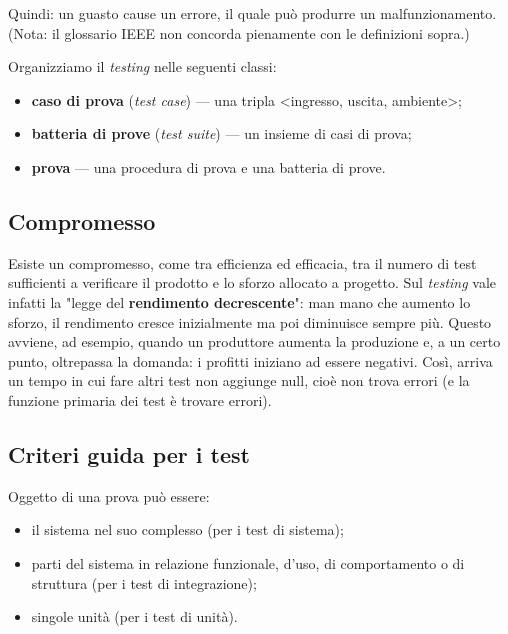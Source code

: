\documentclass[a4paper]{article}
\begin{document}
		
Quindi: un guasto cause un errore, il quale può produrre un malfunzionamento. (Nota: il glossario IEEE non concorda pienamente con le definizioni sopra.)
		
Organizziamo il \emph{testing} nelle seguenti classi:
		
	\begin{itemize}
		
			
	\item \textbf{caso di prova} (\emph{test case}) --- una tripla \textless{}ingresso, uscita, ambiente\textgreater{};
			
	\item \textbf{batteria di prove} (\emph{test suite}) --- un insieme di casi di prova;
			
	\item \textbf{prova} --- una procedura di prova e una batteria di prove.
		
	\end{itemize}


		
	\subsection{Compromesso}

		
Esiste un compromesso, come tra efficienza ed efficacia, tra il numero di test sufficienti a verificare il prodotto e lo sforzo allocato a progetto. Sul \emph{testing} vale infatti la "legge del \textbf{rendimento decrescente}": man mano che aumento lo sforzo, il rendimento cresce inizialmente ma poi diminuisce sempre più. Questo avviene, ad esempio, quando un produttore aumenta la produzione e, a un certo punto, oltrepassa la domanda: i profitti iniziano ad essere negativi. Così, arriva un tempo in cui fare altri test non aggiunge null, cioè non trova errori (e la funzione primaria dei test è trovare errori).

		
	\subsection{Criteri guida per i test}

		
Oggetto di una prova può essere:
		
	\begin{itemize}
		
			
	\item il sistema nel suo complesso (per i test di sistema);
			
	\item parti del sistema in relazione funzionale, d'uso, di comportamento o di struttura (per i test di integrazione);
			
	\item singole unità (per i test di unità).
		
	\end{itemize}
\end{document}
